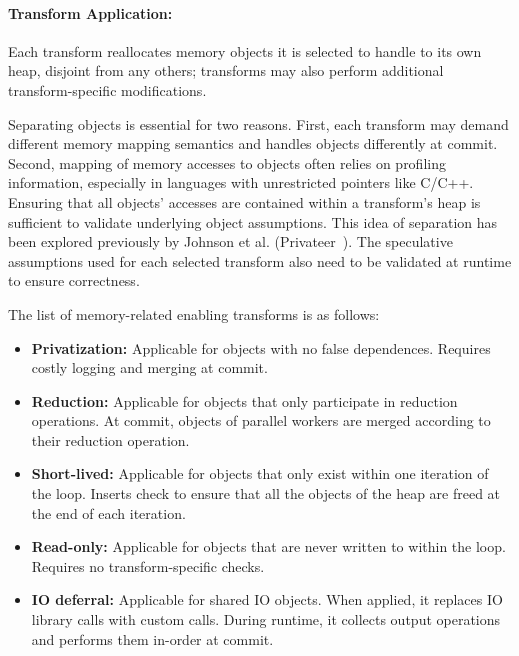 \paragraph{Transform Application:}
Each transform reallocates
memory objects it is selected to handle
to its own heap, disjoint from any others; transforms may also
perform additional transform-specific modifications.

Separating objects is essential
for two reasons. First, each transform may demand different
memory mapping semantics and handles objects differently at commit.
Second, mapping of memory accesses to
objects often relies on profiling information, especially in languages with
unrestricted pointers like C/C++. Ensuring that all objects' accesses
are contained within a transform's heap is sufficient to
validate underlying object assumptions. This idea of separation has
been explored previously by Johnson et al. (Privateer~\cite{johnson:12:pldi}).
The speculative assumptions used for each selected transform also need
to be validated at runtime to ensure correctness.

The list of memory-related enabling transforms is as follows:

\begin{itemize}
%
  \item \textbf{Privatization:} Applicable for objects with no false dependences.
  Requires costly logging and merging at commit.

\item \textbf{Reduction:} Applicable for objects that only participate in
reduction operations. At commit, objects of parallel
workers are merged according to their reduction operation.




\item \textbf{Short-lived:} Applicable for objects that only exist within one
iteration of the loop. Inserts check to ensure that all
the objects of the heap are freed at the end of each iteration.

\item \textbf{Read-only:} Applicable for objects that are never written to within
the loop. Requires no transform-specific checks.

\item \textbf{IO deferral:} Applicable for shared IO objects. When applied, it
replaces IO library calls with custom calls. During runtime, it
collects output operations and performs them in-order at commit.

\end{itemize}

